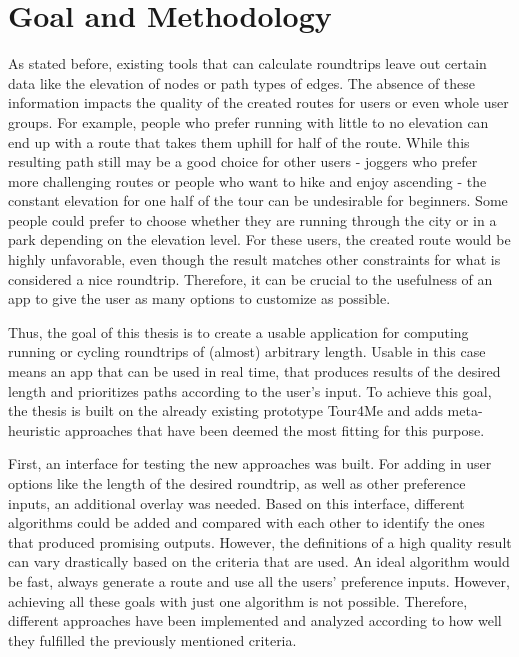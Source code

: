 


\section{Goal and Methodology}
\label{sec:goal}

As stated before, existing tools that can calculate roundtrips leave out certain data like the elevation of nodes or path types of edges.
The absence of these information impacts the quality of the created routes for users or even whole user groups. 
For example, people who prefer running with little to no elevation can end up with a route that takes them uphill for half of the route.
While this resulting path still may be a good choice for other users - joggers who prefer more challenging routes or people who want to hike and enjoy ascending - the constant elevation for one half of the tour can be undesirable for beginners.
Some people could prefer to choose whether they are running through the city or in a park depending on the elevation level.
For these users, the created route would be highly unfavorable, even though the result matches other constraints for what is considered a nice roundtrip.
Therefore, it can be crucial to the usefulness of an app to give the user as many options to customize as possible. 


Thus, the goal of this thesis is to create a usable application for computing running or cycling roundtrips of (almost) arbitrary length. 
Usable in this case means an app that can be used in real time, that produces results of the desired length and prioritizes paths according to the user's input. 
To achieve this goal, the thesis is built on the already existing prototype Tour4Me \cite{buchin_tour4me_2022} and adds meta-heuristic approaches that have been deemed the most fitting for this purpose. 

First, an interface for testing the new approaches was built. 
For adding in user options like the length of the desired roundtrip, as well as other preference inputs, an additional overlay was needed.
Based on this interface, different algorithms could be added and compared with each other to identify the ones that produced promising outputs.
However, the definitions of a high quality result can vary drastically based on the criteria that are used. 
An ideal algorithm would be fast, always generate a route and use all the users' preference inputs.
However, achieving all these goals with just one algorithm is not possible. 
Therefore, different approaches have been implemented and analyzed according to how well they fulfilled the previously mentioned criteria. 

